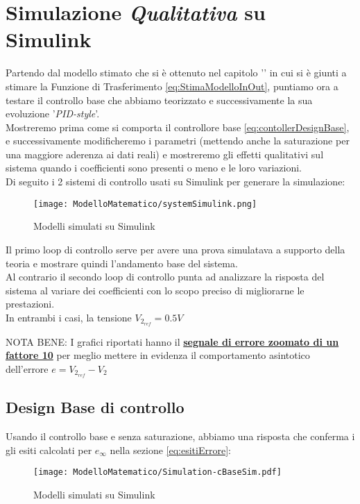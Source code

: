 \section{Simulazione \textit{Qualitativa} su Simulink}
Partendo dal modello stimato che si è ottenuto nel capitolo '' in cui si è giunti a stimare la Funzione di Trasferimento \ref{eq:StimaModelloInOut}, puntiamo ora a testare il controllo base che abbiamo teorizzato e successivamente la sua evoluzione '\textit{PID-style}'.\\
Mostreremo prima come si comporta il controllore base \ref{eq:contollerDesignBase}, e successivamente modificheremo i parametri (mettendo anche la saturazione per una maggiore aderenza ai dati reali) e mostreremo gli effetti qualitativi sul sistema quando i coefficienti sono presenti o meno e le loro variazioni.\\
Di seguito i 2 sistemi di controllo usati su Simulink per generare la simulazione:\vspace{-4mm}
\begin{figure}[H]
	\centering
	\caption[Modelli simulati su Simulink]{Modelli simulati su Simulink}
	\texttt{[image: ModelloMatematico/systemSimulink.png]}
\end{figure}\vspace{-6mm}
\noindent
Il primo loop di controllo  serve per avere una prova simulatava a supporto della teoria e mostrare quindi l'andamento base del sistema.\\
Al contrario il secondo loop di controllo punta ad analizzare la risposta del sistema al variare dei coefficienti con lo scopo preciso di migliorarne le prestazioni.\\
In entrambi i casi, la tensione $ V_{2_{ref}} = 0.5V$
\begin{mdframed}[backgroundcolor=fawn]
\begin{spacing}{1}
	\noindent
	{\footnotesize NOTA BENE: I grafici riportati hanno il \textbf{\underline{segnale di errore zoomato di un fattore 10}} per meglio mettere in evidenza il comportamento asintotico dell'errore $ e = V_{2_{ref}} - V_2 $}
\end{spacing}
\end{mdframed}
\newpage

\subsection{Design Base di controllo}
Usando il controllo base e senza saturazione, abbiamo una risposta che conferma i gli esiti calcolati per $ e_\infty $ nella sezione \ref{eq:esitiErrore}:
\begin{figure}[H]
	\centering
	\caption[Modelli simulati su Simulink]{Modelli simulati su Simulink}
	\texttt{[image: ModelloMatematico/Simulation-cBaseSim.pdf]}
\end{figure}

